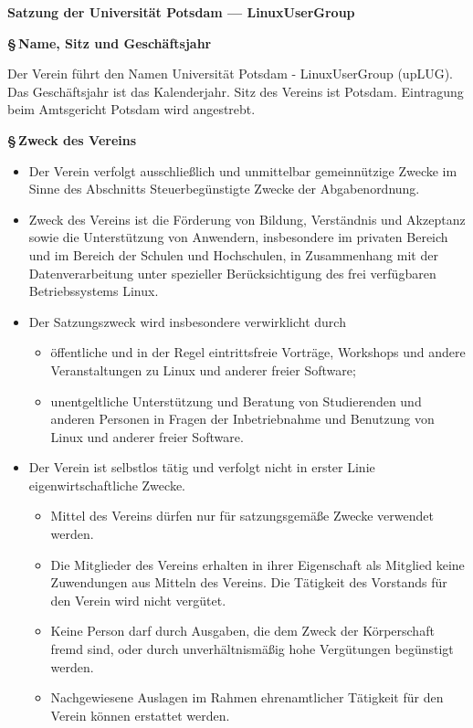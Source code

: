 \documentclass[11pt]{article}
\def\normalfont{\sffamily}
\def\items#1{{%
  \itcounter0%
  \begin{itemize}
  #1
  \end{itemize}
}}
\let\it\item%
\def\item{
  \advance\itcounter1%
  \it[(\the\itcounter)]
}
\def\paragraf#1{
  \advance\itcounter1%
  \par\medskip
  {\large\bfseries \S\,\the\itcounter\quad#1}
  \par\smallskip
}
\begin{document}
\normalfont
\fontsize{11pt}{8pt}\selectfont

\centerline{\Large\bfseries  Satzung der Universit{\"a}t Potsdam --- LinuxUserGroup}
\par
\bigskip

\paragraf{Name, Sitz und Gesch{\"a}ftsjahr}
\medskip

Der Verein f{\"u}hrt den Namen \glqq Universit{\"a}t Potsdam - LinuxUserGroup\grqq{} (upLUG).
Das Gesch{\"a}ftsjahr ist das Kalenderjahr.
Sitz des Vereins ist Potsdam.
Eintragung beim Amtsgericht Potsdam wird angestrebt.
%
%
\bigskip

\paragraf{Zweck des Vereins}

\items{
  \item
    Der Verein verfolgt ausschlie{\ss}lich und unmittelbar gemeinn{\"u}tzige Zwecke
    im Sinne des Abschnitts \glqq Steuerbeg{\"u}nstigte Zwecke\grqq{} der Abgabenordnung.
  \item
     Zweck des Vereins ist die F{\"o}rderung von Bildung, Verst{\"a}ndnis und
     Akzeptanz sowie die Unter\-st{\"u}tzung von Anwendern, insbesondere im privaten Bereich
     und im Bereich der Schulen und Hochschulen, in Zusammenhang mit der Datenverarbeitung
     unter spezieller Ber{\"u}cksichtigung des frei ver\-f{\"u}g\-baren Betriebssystems Linux.
   \item
     Der Satzungszweck wird insbesondere verwirklicht durch
      \items{
        \item
          {\"o}ffentliche und in der Regel eintrittsfreie
          Vortr{\"a}ge, Workshops und andere Veranstaltungen zu Linux und anderer
          freier Software;
        \item
          unentgeltliche Unterst{\"u}tzung und Beratung von Studierenden und anderen Personen
          in Fragen der Inbetriebnahme und Benutzung von Linux und anderer freier Software.
      }
   \item
     Der Verein ist selbstlos t{\"a}tig und verfolgt nicht in erster Linie eigenwirtschaftliche Zwecke.
     \items{
       \item
         Mittel des Vereins d{\"u}rfen nur f{\"u}r satzungsgem{\"a}{\ss}e Zwecke verwendet werden.
       \item
         Die Mitglieder des Vereins erhalten in ihrer Eigenschaft als Mitglied
         keine Zuwendungen aus Mitteln des Vereins. Die T{\"a}tigkeit des Vorstands f{\"u}r den
         Verein wird nicht verg{\"u}tet.
       \item
         Keine Person darf durch Ausgaben, die dem Zweck der K{\"o}rperschaft fremd sind, oder durch
         unverh{\"a}ltnism{\"a}{\ss}ig hohe Verg{\"u}tungen beg{\"u}nstigt werden.
       \item
         Nachgewiesene Auslagen im Rahmen ehrenamtlicher T{\"a}tigkeit f{\"u}r den Verein
         k{\"o}nnen erstattet werden.
     }
}
\end{document}
